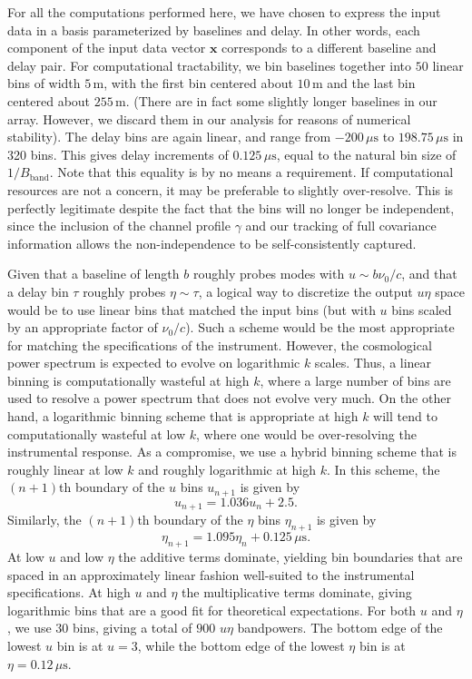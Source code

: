 \documentclass[twocolumn,aps,prd,nofootinbib,showpacs]{revtex4-1}
\begin{document}
For all the computations performed here, we have chosen to express the input data in a basis parameterized by baselines and delay.  In other words, each component of the input data vector $\mathbf{x}$ corresponds to a different baseline and delay pair.  For computational tractability, we bin baselines together into $50$ linear bins of width $5\,\textrm{m}$, with the first bin centered about $10\,\textrm{m}$ and the last bin centered about $255\,\textrm{m}$.  (There are in fact some slightly longer baselines in our array.  However, we discard them in our analysis for reasons of numerical stability).  The delay bins are again linear, and range from $-200\,\mu\textrm{s}$ to $198.75\,\mu\textrm{s}$ in 320 bins.  This gives delay increments of $0.125\,\mu\textrm{s}$, equal to the natural bin size of $1/B_\textrm{band}$.  Note that this equality is by no means a requirement.  If computational resources are not a concern, it may be preferable to slightly over-resolve.  This is perfectly legitimate despite the fact that the bins will no longer be independent, since the inclusion of the channel profile $\gamma$ and our tracking of full covariance information allows the non-independence to be self-consistently captured.

Given that a baseline of length $b$ roughly probes modes with $u \sim b \nu_0 / c$, and that a delay bin $\tau$ roughly probes $\eta \sim \tau$, a logical way to discretize the output $u\eta$ space would be to use linear bins that matched the input bins (but with $u$ bins scaled by an appropriate factor of $\nu_0 / c$).  Such a scheme would be the most appropriate for matching the specifications of the instrument.  However, the cosmological power spectrum is expected to evolve on logarithmic $k$ scales.  Thus, a linear binning is computationally wasteful at high $k$, where a large number of bins are used to resolve a power spectrum that does not evolve very much.  On the other hand, a logarithmic binning scheme that is appropriate at high $k$ will tend to computationally wasteful at low $k$, where one would be over-resolving the instrumental response.  As a compromise, we use a hybrid binning scheme that is roughly linear at low $k$ and roughly logarithmic at high $k$.  In this scheme, the $(n+1)$th boundary of the $u$ bins $u_{n+1}$ is given by
\begin{equation}
u_{n+1} = 1.036 u_n + 2.5.
\end{equation}
Similarly, the $(n+1)$th boundary of the $\eta$ bins $\eta_{n+1}$ is given by
\begin{equation}
\eta_{n+1} = 1.095 \eta_n + 0.125\,\mu\textrm{s}.
\end{equation}
At low $u$ and low $\eta$ the additive terms dominate, yielding bin boundaries that are spaced in an approximately linear fashion well-suited to the instrumental specifications.  At high $u$ and $\eta$ the multiplicative terms dominate, giving logarithmic bins that are a good fit for theoretical expectations.  For both $u$ and $\eta$, we use $30$ bins, giving a total of $900$ $u\eta$ bandpowers.  The bottom edge of the lowest $u$ bin is at $u=3$, while the bottom edge of the lowest $\eta$ bin is at $\eta=0.12\,\mu\textrm{s}$.
\end{document}
